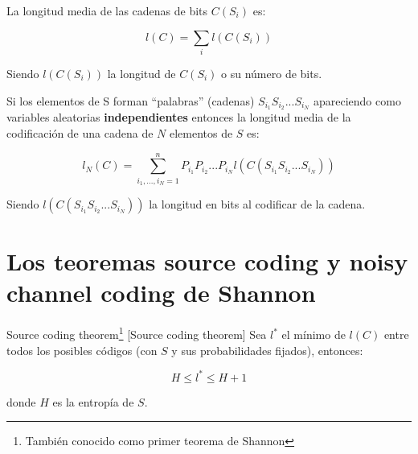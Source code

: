 	\begin{defn}
		La longitud media de las cadenas de bits $C(S_i)$ es:

		$$ l(C) = \sum_i l(C(S_i))$$

		Siendo $l(C(S_i))$ la longitud de $C(S_i)$ o su número de bits.
	\end{defn}

	Si los elementos de S forman ``palabras'' (cadenas) $S_{i_1} S_{i_2} ... S_{i_N}$ apareciendo como variables aleatorias \textbf{independientes} entonces la longitud media de la codificación de una cadena de $N$ elementos de $S$ es:

	$$l_{N}(C) = \sum_{i_1,...,i_N = 1}^{n} P_{i_1} P_{i_2} ... P_{i_N} l(C(S_{i_1} S_{i_2} ... S_{i_N}))$$

	Siendo $l(C(S_{i_1} S_{i_2} ... S_{i_N}))$ la longitud en bits al codificar de la cadena.

\section{Los teoremas source coding y noisy channel coding de Shannon}

	\begin{theorem}{Source coding theorem\footnote{También conocido como primer teorema de Shannon} }[Source coding theorem]
		Sea $l^*$ el mínimo de $l(C)$ entre todos los posibles códigos (con $S$ y sus probabilidades fijados), entonces:

		$$ H \leq l^* \leq H + 1 $$

		donde $H$ es la entropía de $S$.

	\end{theorem}


